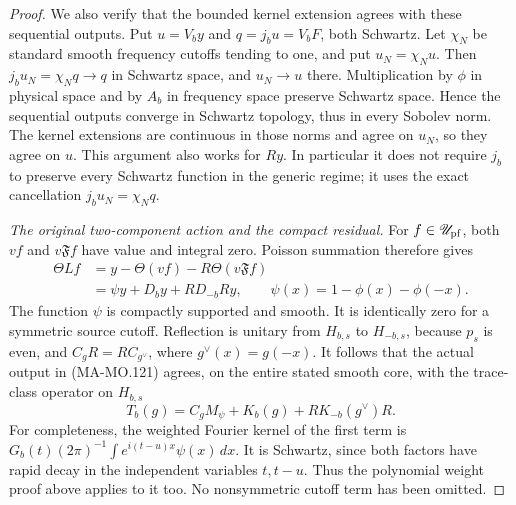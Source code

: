 \begin{proof}
We also verify that the bounded kernel extension agrees
with these sequential outputs. Put \(u=V_by\) and
\(q=j_bu=V_bF\), both Schwartz. Let \(\chi_N\) be
standard smooth frequency cutoffs tending to one, and
put \(u_N=\chi_Nu\). Then
\(j_bu_N=\chi_Nq\to q\) in Schwartz space, and
\(u_N\to u\) there. Multiplication by \(\phi\) in
physical space and by \(A_b\) in frequency space preserve
Schwartz space. Hence the sequential outputs converge
in Schwartz topology, thus in every Sobolev norm.
The kernel extensions are continuous in those norms and
agree on \(u_N\), so they agree on \(u\). This argument
also works for \(Ry\). In particular it does not require
\(j_b\) to preserve every Schwartz function in the
generic regime; it uses the exact cancellation
\(j_bu_N=\chi_Nq\).

\emph{The original two-component action and the compact residual.}
For \(f\in\mathscr U_{\rm pf}\), both \(vf\) and
\(v\mathfrak Ff\) have value and integral zero.
Poisson summation therefore gives
\[
 \begin{aligned}
 \Theta Lf
 &=y-\Theta(vf)-R\Theta(v\mathfrak Ff)\\
 &=\psi y+D_by+RD_{-b}Ry,\qquad
                   \psi(x)=1-\phi(x)-\phi(-x).
 \end{aligned}
 \tag{MA-MO.130}
\]
The function \(\psi\) is compactly supported and smooth.
It is identically zero for a symmetric source cutoff.
Reflection is unitary from \(H_{b,s}\) to \(H_{-b,s}\),
because \(p_s\) is even, and
\(C_gR=RC_{g^\vee}\), where \(g^\vee(x)=g(-x)\).
It follows that the actual output in (MA-MO.121) agrees,
on the entire stated smooth core, with the trace-class
operator on \(H_{b,s}\)
\[
 T_b(g)=C_gM_\psi+K_b(g)+RK_{-b}(g^\vee)R.
 \tag{MA-MO.131}
\]
For completeness, the weighted Fourier kernel of the first
term is
\(G_b(t)(2\pi)^{-1}\int e^{i(t-u)x}\psi(x)\,dx\).
It is Schwartz, since both factors have rapid decay in
the independent variables \(t,t-u\). Thus the polynomial
weight proof above applies to it too. No nonsymmetric
cutoff term has been omitted.


\end{proof}
